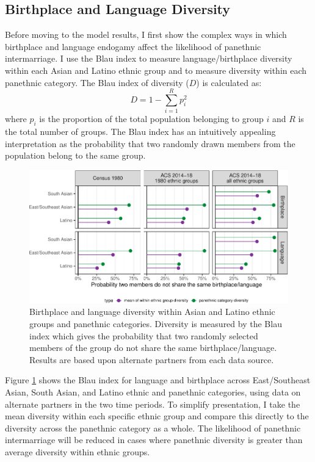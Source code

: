 \documentclass[11pt,]{article}
\begin{document}
\hypertarget{birthplace-and-language-diversity}{%
\subsection{Birthplace and Language Diversity}\label{birthplace-and-language-diversity}}

Before moving to the model results, I first show the complex ways in which birthplace and language endogamy affect the likelihood of panethnic intermarriage. I use the Blau index \citep{blau_inequality_1977} to measure language/birthplace diversity within each Asian and Latino ethnic group and to measure diversity within each panethnic category. The Blau index of diversity (\(D\)) is calculated as: 
\begin{equation}
D=1-\sum_{i=1}^R p_i^2 
\end{equation} 
where \(p_i\) is the proportion of the total population belonging to group \(i\) and \(R\) is the total number of groups. The Blau index has an intuitively appealing interpretation as the probability that two randomly drawn members from the population belong to the same group.

\begin{figure}
\centering
\includegraphics{main_files/figure-latex/diversity-pan-bar-1.pdf}
\caption{\label{fig:diversity-pan-bar}Birthplace and language diversity within Asian and Latino ethnic groups and panethnic categories. Diversity is measured by the Blau index which gives the probability that two randomly selected members of the group do not share the same birthplace/language. Results are based upon alternate partners from each data source.}
\end{figure}

Figure \ref{fig:diversity-pan-bar} shows the Blau index for language and birthplace across East/Southeast Asian, South Asian, and Latino ethnic and panethnic categories, using data on alternate partners in the two time periods. To simplify presentation, I take the mean diversity within each specific ethnic group and compare this directly to the diversity across the panethnic category as a whole. The likelihood of panethnic intermarriage will be reduced in cases where panethnic diversity is greater than average diversity within ethnic groups.
\end{document}
